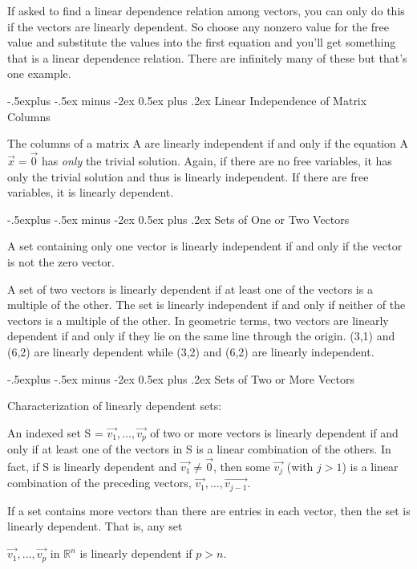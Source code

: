 \documentclass[10pt,landscape]{article}
\makeatletter
\renewcommand{\subsection}{\@startsection{subsection}{2}{0mm}%
                                {-.5explus -.5ex minus -2ex}%
                                {0.5ex plus .2ex}%
                                {\normalfont\footnotesize\bfseries}}
\makeatother
\begin{document}
\begin{multicols}{4}
\medskip

If asked to find a linear dependence relation among vectors, you can only do this if the vectors are linearly dependent. So choose any nonzero value for the free value and substitute the values into the first equation and you'll get something that is a linear dependence relation. There are infinitely many of these but that's one example.

\subsection{Linear Independence of Matrix Columns}

The columns of a matrix A are linearly independent if and only if the equation A$\vec{x}=\vec{0}$ has \textit{only} the trivial solution. Again, if there are no free variables, it has only the trivial solution and thus is linearly independent. If there are free variables, it is linearly dependent. 

\subsection{Sets of One or Two Vectors}

A set containing only one vector is linearly independent if and only if the vector is not the zero vector. 

A set of two vectors is linearly dependent if at least one of the vectors is a multiple of the other. The set is linearly independent if and only if neither of the vectors is a multiple of the other.  In geometric terms, two vectors are linearly dependent if and only if they lie on the same line through the origin.  (3,1) and (6,2) are linearly dependent while (3,2) and (6,2) are linearly independent.

\subsection{Sets of Two or More Vectors}

Characterization of linearly dependent sets:

An indexed set S = {$\vec{v_1},\dots,\vec{v_p}$} of two or more vectors is linearly dependent if and only if at least one of the vectors in S is a linear combination of the others. In fact, if S is linearly dependent and $\vec{v_1}\ne \vec{0}$, then some $\vec{v_j}$ (with $j > 1$) is a linear combination of the preceding vectors, $\vec{v_1},\dots,\vec{v_{j-1}}$.

If a set contains more vectors than there are entries in each vector, then the set is linearly dependent. That is, any set {$\vec{v_1},\dots,\vec{v_p}$ in $\mathbb{R}^n$ is linearly dependent if $p > n$.

}
\end{multicols}
\end{document}
